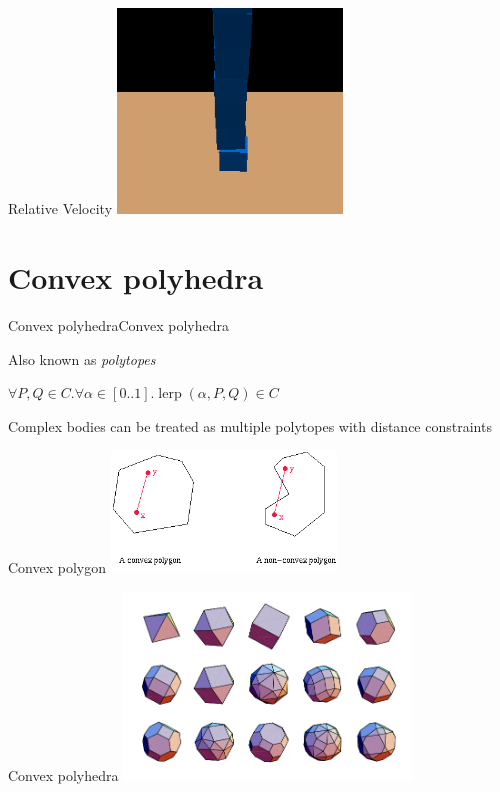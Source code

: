\documentclass{beamer}
\DeclareMathOperator{\lerp}{lerp}
\begin{document}
\begin{frame}{Relative Velocity}
\center
\includegraphics[width=6cm]{Pics/Stacking.png}
\end{frame}

\section{Convex polyhedra}
\begin{slide}{Convex polyhedra}{Convex polyhedra}{
\item Also known as \textit{polytopes}
\item $\forall P,Q \in C. \forall \alpha \in [0..1]. \lerp(\alpha, P, Q) \in C$
\item Complex bodies can be treated as multiple polytopes with distance constraints
}\end{slide}

\begin{frame}{Convex polygon}
\center
\includegraphics[width=6cm]{Pics/ConvexPolyhedron.png}
\end{frame}

\begin{frame}{Convex polyhedra}
\center
\includegraphics[height=5cm]{Pics/ConvexPolyhedra.png}
\end{frame}
\end{document}
